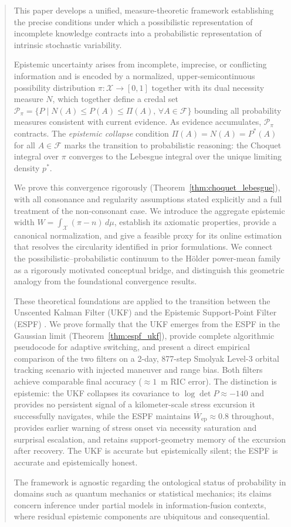 \documentclass[12pt]{article}
\newcommand{\Ppi}{\mathcal{P}_\pi}
\newcommand{\calF}{\mathcal{F}}
\newcommand{\calX}{\mathcal{X}}
\begin{document}
\begin{abstract}
This paper develops a unified, measure-theoretic framework establishing the precise
conditions under which a possibilistic representation of incomplete knowledge
contracts into a probabilistic representation of intrinsic stochastic variability.

Epistemic uncertainty arises from incomplete, imprecise, or conflicting information
and is encoded by a normalized, upper-semi\-continuous possibility distribution
$\pi:\calX\to[0,1]$ together with its dual necessity measure $N$, which together
define a credal set $\Ppi = \{P \mid N(A)\le P(A)\le\Pi(A),\,\forall A\in\calF\}$
bounding all probability measures consistent with current evidence.
As evidence accumulates, $\Ppi$ contracts.
The \emph{epistemic collapse} condition $\Pi(A)=N(A)=P^*(A)$ for all $A\in\calF$
marks the transition to probabilistic reasoning: the Choquet integral over $\pi$
converges to the Lebesgue integral over the unique limiting density $p^*$.

We prove this convergence rigorously (Theorem~\ref{thm:choquet_lebesgue}), with
all consonance and regularity assumptions stated explicitly and a full treatment of
the non-consonant case.
We introduce the aggregate epistemic width
$W = \int_\calX (\pi - n)\,d\mu$,
establish its axiomatic properties, provide a canonical normalization,
and give a feasible proxy for its online estimation that resolves the circularity
identified in prior formulations.
We connect the possibilistic--probabilistic continuum to the H\"older power-mean
family as a rigorously motivated conceptual bridge, and distinguish this
geometric analogy from the foundational convergence results.

These theoretical foundations are applied to the transition between the
Unscented Kalman Filter (UKF) and the Epistemic Support-Point Filter (ESPF)
\cite{jah2025espf}.
We prove formally that the UKF emerges from the ESPF in the Gaussian limit
(Theorem~\ref{thm:espf_ukf}), provide complete algorithmic pseudocode for
adaptive switching, and present a direct empirical comparison of the two
filters on a 2-day, 877-step Smolyak Level-3 orbital tracking scenario
with injected maneuver and range bias.
Both filters achieve comparable final accuracy ($\approx 1$~m RIC error).
The distinction is epistemic: the UKF collapses its covariance to
$\log\det P \approx -140$ and provides no persistent signal of a
kilometer-scale stress excursion it successfully navigates, while
the ESPF maintains $\overline{W}_\mathrm{ep}\approx 0.8$ throughout,
provides earlier warning of stress onset via necessity saturation and
surprisal escalation, and retains support-geometry memory of the excursion
after recovery.
The UKF is accurate but epistemically silent; the ESPF is accurate and
epistemically honest.

The framework is agnostic regarding the ontological status of probability in
domains such as quantum mechanics or statistical mechanics; its claims concern
inference under partial models in information-fusion contexts, where residual
epistemic components are ubiquitous and consequential.
\end{abstract}
\end{document}
